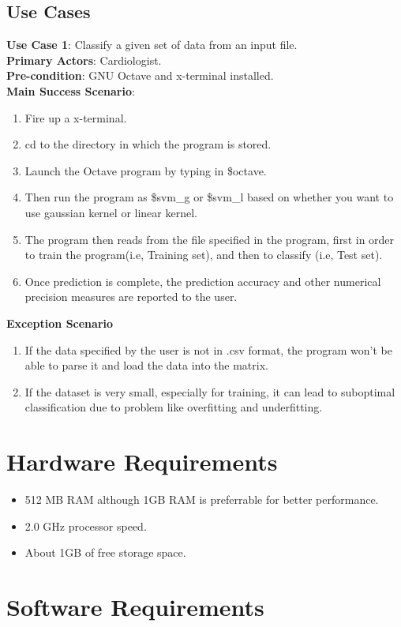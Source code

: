 \documentclass[11pt,a4paper]{report}
\begin{document}
{\subsection{Use Cases}
\textbf{Use Case 1}: Classify a given set of data from an input file.\\
\textbf{Primary Actors}: Cardiologist.\\
\textbf{Pre-condition}: GNU Octave and x-terminal installed.\\
\textbf{Main Success Scenario}:
\begin{enumerate}
\item Fire up a x-terminal.
\item cd to the directory in which the program is stored.
\item Launch the Octave program by typing in \$octave. 
\item Then run the program as \$svm\_g or \$svm\_l based on whether you want to use gaussian kernel or linear kernel.
\item The program then reads from the file specified in the program, first in order to train the program(i.e, Training set), and then to classify (i.e, Test set).
\item Once prediction is complete, the prediction accuracy and other numerical precision measures are reported to the user.
\end{enumerate}
\newpage
\textbf{Exception Scenario}
\begin{enumerate}
\item If the data specified by the user is not in .csv format, the program won't be able to parse it and load the data into the matrix.
\item If the dataset is very small, especially for training, it can lead to suboptimal classification due to problem like overfitting and underfitting. 
\end{enumerate}

\section{Hardware Requirements}
\bigskip
\begin{itemize}
\item 512 MB RAM although 1GB RAM is preferrable for better performance.
\item 2.0 GHz processor speed.
\item About 1GB of free storage space.
\end{itemize}

\section{Software Requirements}

}
\end{document}
